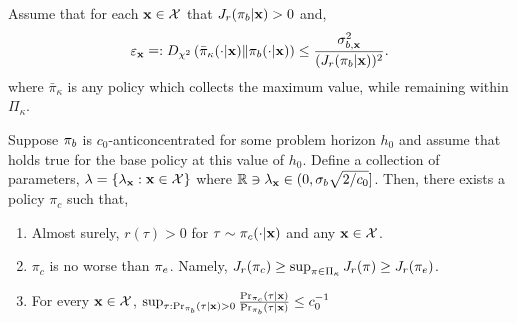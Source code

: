     \begin{property}[Regularity] \label{prop:reg}
Assume that for each $\mathbf{x} \in \mathcal{X}$ that $J_r(\pi_b|\mathbf{x}) > 0$ and,
\begin{align*}
    \varepsilon_{\mathbf{x}} \mathrel{\mathop=}: D_{\chi^2} \left( \bar{\pi}_\kappa (\cdot|\mathbf{x}) \| \pi_b(\cdot|\mathbf{x}) \right) \le \frac{\sigma_{b,\mathbf{x}}^2}{(J_r(\pi_b|\mathbf{x}))^2}.
\end{align*}
where $\bar{\pi}_\kappa$ is any policy which collects the maximum value, while remaining within $\Pi_\kappa$.
\end{property}

\begin{lemma} \label{lemma:pi_lambda}
Suppose $\pi_b$ is $c_0$-anticoncentrated for some problem horizon $h_0$ and assume that  holds true for the base policy at this value of $h_0$. Define a collection of parameters, $\lambda = \{ \lambda_{\mathbf{x}} : \mathbf{x} \in \mathcal{X} \}$ where $\mathbb{R} \ni \lambda_{\mathbf{x}} \in (0,\sigma_b \sqrt{2/c_0}]$. Then, there exists a policy $\pi_c$ such that,
\begin{enumerate}
    \item Almost surely, $r(\tau) > 0$ for $\tau \sim \pi_c (\cdot|\mathbf{x})$ and any $\mathbf{x} \in \mathcal{X}$.
    \item $\pi_c$ is no worse than $\pi_e$. Namely, $J_r (\pi_c) \ge \sup_{\pi \in \Pi_\kappa} J_r(\pi) \ge J_r (\pi_e) $.
    \item For every $\mathbf{x} \in \mathcal{X}$, $\sup_{\tau : \Pr_{\pi_b} (\tau|\mathbf{x}) > 0} \frac{\Pr_{\pi_c} (\tau|\mathbf{x})}{\Pr_{\pi_b} (\tau|\mathbf{x})} \le c_0^{-1}$ %
\end{enumerate}
\end{lemma}
